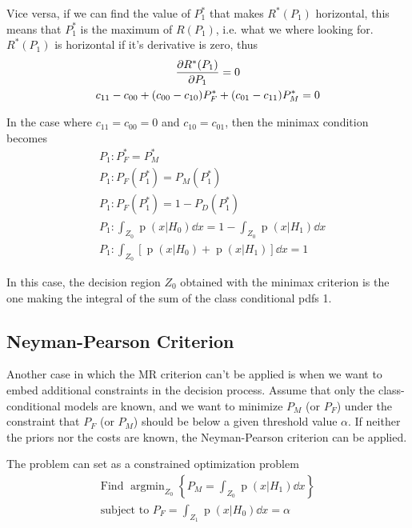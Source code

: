 \documentclass[oneside,onecolumn]{report}
\DeclareMathOperator*{\argmin}{argmin}
\DeclareMathOperator*{\pdf}{p}
\begin{document}
Vice versa, if we can find the value of $P_1^*$ that makes $R^*(P_1)$ horizontal, this means that $P_1^*$ is the maximum of $R(P_1)$, i.e. what we where looking for.
$R^*(P_1)$ is horizontal if it's derivative is zero, thus
\begin{gather*}
    \pdv{R^*(P_1)}{P_1} = 0 \\
    c_{11} - c_{00} + (c_{00} - c_{10}) P_F^* + (c_{01} - c_{11}) P_M^* = 0
\end{gather*}

In the case where $c_{11} = c_{00} = 0$ and $c_{10} = c_{01}$, then the minimax condition becomes
\begin{align*}
    &P_1: P_F^* = P_M^* \\
    &P_1: P_F(P_1^*) = P_M(P_1^*) \\
    &P_1: P_F(P_1^*) = 1 - P_D(P_1^*) \\
    &P_1: \int_{Z_0} \pdf(x | H_0) \dd x = 1 - \int_{Z_0} \pdf(x | H_1) \dd x \\
    &P_1: \int_{Z_0} [ \pdf(x | H_0) + \pdf(x | H_1)] \dd x = 1
\end{align*}

In this case, the decision region $Z_0$ obtained with the minimax criterion is the one making the integral of the sum of the class conditional pdfs 1.


\subsection{Neyman-Pearson Criterion}
Another case in which the MR criterion can't be applied is when we want to embed additional constraints in the decision process.
Assume that only the class-conditional models are known, and we want to minimize $P_M$ (or $P_F$) under the constraint that $P_F$ (or $P_M$) should be below a given threshold value $\alpha$.
If neither the priors nor the costs are known, the Neyman-Pearson criterion can be applied.

The problem can set as a constrained optimization problem
\begin{gather}
    \text{Find } \argmin_{Z_0}\left\{ P_M = \int_{Z_0} \pdf(x | H_1) \dd x \right\} \\
    \text{subject to } P_F = \int_{Z_1} \pdf(x | H_0) \dd x = \alpha
\end{gather}
\end{document}
